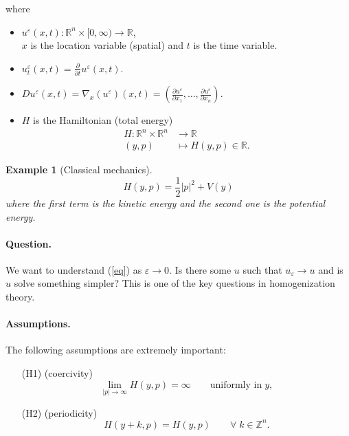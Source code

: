 \documentclass[12pt, oneside]{amsart}  	%
\newtheorem{example}{Example}
\begin{document}
where

\begin{itemize}
\item $u^\varepsilon(x,t): \mathbb{R}^n\times[0,\infty)\longrightarrow\mathbb{R}$,\\ $x$ is the location variable (spatial) and $t$ is the time variable.
\item $u_t^\varepsilon(x,t) = \frac{\partial}{\partial t}u^\varepsilon(x,t)$.
\item $Du^\varepsilon(x,t) = \nabla_x(u^\varepsilon)(x,t) = \left(\frac{\partial u^\varepsilon}{\partial x_1},\ldots, \frac{\partial u^\varepsilon}{\partial x_n}\right)$.
\item $H$ is the Hamiltonian (total energy)
\begin{align*}
H: \mathbb{R}^n\times \mathbb{R}^n &\longrightarrow \mathbb{R}\\
(y,p)&\longmapsto H(y,p) \in \mathbb{R}.
\end{align*}
\end{itemize}


\begin{example}[Classical mechanics]
\begin{equation*}
H(y,p) = \frac{1}{2}|p|^2 + V(y)
\end{equation*}
where the first term is the kinetic energy and the second one is the potential energy.
\end{example}

\paragraph{\textbf{Question.}}
We want to understand (\ref{eq}) as $\varepsilon\longrightarrow 0$. Is there some $u$ such that $u_\varepsilon\longrightarrow u$ and is $u$ solve something simpler? This is one of the key questions in homogenization theory.\\



\paragraph{\textbf{Assumptions.}} The following assumptions are extremely important:
\begin{itemize}
\item[(H1)] (coercivity)
\begin{equation*}
\lim_{|p|\longrightarrow\infty} H(y,p) = \infty \qquad\text{uniformly in}\;y,
\end{equation*}
\item[(H2)] (periodicity)
\begin{equation*}
H(y+k,p) = H(y,p) \qquad\forall\;k\in \mathbb{Z}^n.
\end{equation*}
\end{itemize}
\end{document}
